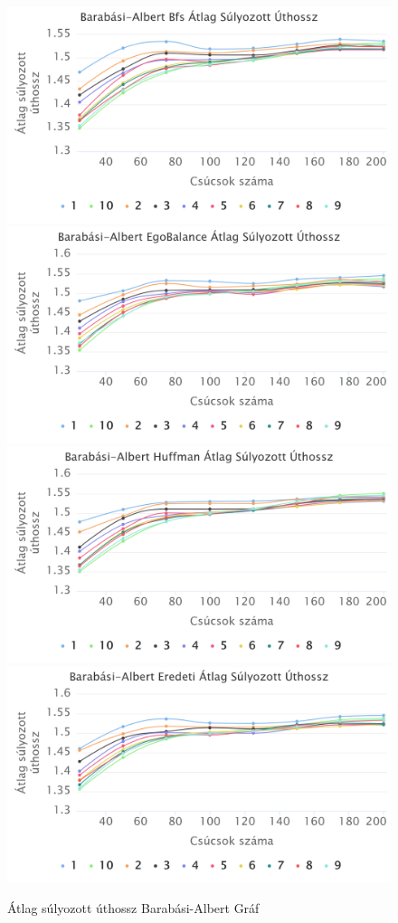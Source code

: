 \documentclass[12pt]{report}
\begin{document}
\begin{figure}[H]
	\begin{center}
		\includegraphics[width=0.49\linewidth]{pictures/barabasi_avg_len_bfs.png}
		\includegraphics[width=0.49\linewidth]{pictures/barabasi_avg_len_egobalance.png}
		\includegraphics[width=0.49\linewidth]{pictures/barabasi_avg_len_huffman.png}
		\includegraphics[width=0.49\linewidth]{pictures/barabasi_avg_len_original.png}
		\caption{Átlag súlyozott úthossz Barabási-Albert Gráf}
		\label{avg-len-barabsi}
	\end{center}
\end{figure}
\end{document}
